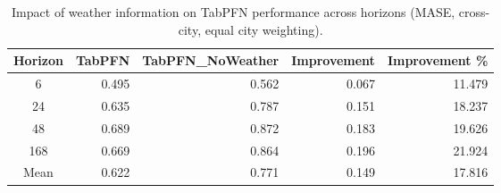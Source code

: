 \begin{table}
\centering
\caption{Impact of weather information on TabPFN performance across horizons (MASE, cross-city, equal city weighting).}
\label{tab:tabpfn_weather_cross_city_by_horizon}
\begin{tabular}{crrrr}
\toprule
Horizon & TabPFN & TabPFN\_NoWeather & Improvement & Improvement \% \\
\midrule
6 & 0.495 & 0.562 & 0.067 & 11.479 \\
24 & 0.635 & 0.787 & 0.151 & 18.237 \\
48 & 0.689 & 0.872 & 0.183 & 19.626 \\
168 & 0.669 & 0.864 & 0.196 & 21.924 \\
\midrule
Mean & 0.622 & 0.771 & 0.149 & 17.816 \\
\bottomrule
\end{tabular}
\end{table}
